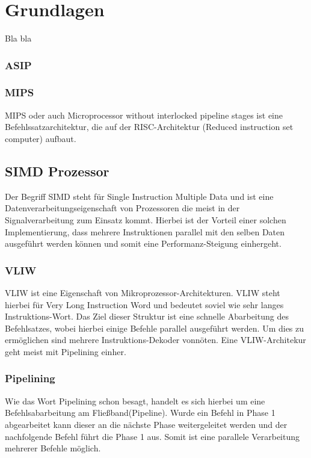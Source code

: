 \chapter{Grundlagen}
\label{chap:grundlagen}

Bla bla
\subsection{ASIP}


\subsection{MIPS}
MIPS oder auch \glqq Microprocessor without interlocked pipeline stages\grqq{} ist eine Befehlssatzarchitektur, die auf der RISC-Architektur  (Reduced instruction set computer) aufbaut.

\section{SIMD Prozessor}
\label{sec:VLIW}
Der Begriff SIMD steht für Single Instruction Multiple Data und ist eine Datenverarbeitungseigenschaft von Prozessoren die meist in der Signalverarbeitung zum Einsatz kommt. Hierbei ist der Vorteil einer solchen Implementierung, dass mehrere Instruktionen parallel mit den selben Daten ausgeführt werden können und somit eine Performanz-Steigung einhergeht.

\subsection{VLIW}
VLIW ist eine Eigenschaft von Mikroprozessor-Architekturen. VLIW steht hierbei für Very Long Instruction Word und bedeutet soviel wie sehr langes Instruktions-Wort. Das Ziel dieser Struktur ist eine schnelle Abarbeitung des Befehlsatzes, wobei hierbei einige Befehle parallel ausgeführt werden. Um dies zu ermöglichen sind mehrere Instruktions-Dekoder vonnöten. Eine VLIW-Architekur geht meist mit Pipelining einher. 
\subsection{Pipelining}
Wie das Wort Pipelining schon besagt, handelt es sich hierbei um eine Befehlsabarbeitung am Fließband(Pipeline). Wurde ein Befehl in Phase 1 abgearbeitet kann dieser an die nächste Phase weitergeleitet werden und der nachfolgende Befehl führt die Phase 1 aus. Somit ist eine parallele Verarbeitung mehrerer Befehle möglich. 
\newpage

